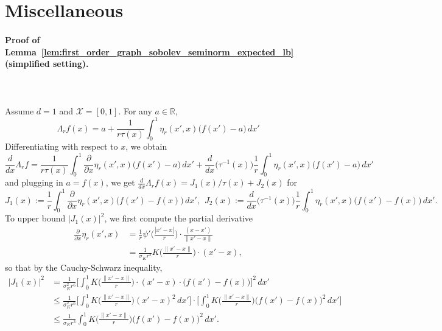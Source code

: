 \documentclass{article}
\newcommand{\Reals}{\mathbb{R}}
\newcommand{\1}{\mathbf{1}}
\newcommand{\Xset}{\mathcal{X}}
\theoremstyle{alden}
\theoremstyle{aldenthm}
\theoremstyle{definition}
\theoremstyle{remark}
\begin{document}
\clearpage

\section{Miscellaneous}

\paragraph{Proof of Lemma~\ref{lem:first_order_graph_sobolev_seminorm_expected_lb} (simplified setting).}
\mbox{} \\
\mbox{} \\
Assume $d = 1$ and $\Xset = [0,1]$. For any $a \in \Reals$,
\begin{equation*}
\Lambda_rf(x) = a + \frac{1}{r\tau(x)}\int_{0}^{1} \eta_r(x',x)\bigl(f(x') - a\bigr)\,dx'
\end{equation*}
Differentiating with respect to $x$, we obtain
\begin{equation*}
\frac{d}{dx}\Lambda_rf = \frac{1}{r\tau(x)}\int_{0}^{1} \frac{\partial}{\partial x}\eta_r(x',x)\bigl(f(x') - a\bigr)\,dx' + \frac{d}{dx}\bigl(\tau^{-1}(x)\bigr) \frac{1}{r}\int_{0}^{1} \eta_r(x',x)\bigl(f(x') - a\bigr)\,dx'
\end{equation*} 
and plugging in $a = f(x)$, we get $\frac{d}{dx}\Lambda_rf(x) = J_1(x)/\tau(x) + J_2(x)$ for
\begin{equation*}
J_1(x) := \frac{1}{r}\int_{0}^{1} \frac{\partial}{\partial x}\eta_r(x',x)\bigl(f(x') - f(x)\bigr)\,dx',~~ J_2(x) := \frac{d}{dx}\bigl(\tau^{-1}(x)\bigr)\frac{1}{r}\int_{0}^{1} \eta_r(x',x)\bigl(f(x') - f(x)\bigr)\,dx'.
\end{equation*}
To upper bound $\bigl|J_1(x)\bigr|^2$, we first compute the partial derivative
\begin{align*}
\frac{\partial}{\partial x}\eta_r(x',x) & = \frac{1}{r} \psi'\biggl(\frac{|x'  - x|}{r}\biggr) \cdot \frac{(x - x')}{\|x' - x\|} \\
& = \frac{1}{\sigma_Kr^2} K\biggl(\frac{\|x' - x\|}{r}\biggr) \cdot (x' - x),
\end{align*}
so that by the Cauchy-Schwarz inequality,
\begin{align*}
\bigl|J_1(x)\bigr|^2 & = \frac{1}{\sigma_K^2 r^6} \Biggl[\int_{0}^{1} K\biggl(\frac{\|x' - x\|}{r}\biggr) \cdot (x' - x) \cdot \bigl(f(x') - f(x)\bigr)\Biggr]^2 \,dx' \\
& \leq \frac{1}{\sigma_K^2r^6} \biggl[\int_{0}^{1}K\biggl(\frac{\|x' - x\|}{r}\biggr)(x' - x)^2\,dx'\biggr] \cdot \biggl[\int_{0}^{1}K\biggl(\frac{\|x' - x\|}{r}\biggr)\bigl(f(x') - f(x)\bigr)^2\,dx'\biggr] \\
& \leq \frac{1}{\sigma_K r^3}\int_{0}^{1}K\biggl(\frac{\|x' - x\|}{r}\biggr)\bigl(f(x') - f(x)\bigr)^2\,dx'.
\end{align*}
\end{document}
